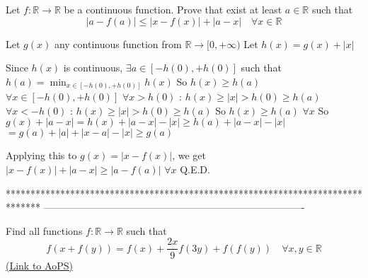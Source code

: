 \begin{solution}
	\begin{tcolorbox}Let $f:\mathbb{R}\to \mathbb{R}$ be a continuous function. Prove that exist at least $a\in \mathbb{R}$ such that 
\[\left| {a - f\left( a \right)} \right| \le \left| {x - f\left( x \right)} \right| + \left| {a - x} \right| \quad \forall x\in \mathbb{R}\]\end{tcolorbox}
Let $g(x)$ any continuous function from $\mathbb R\to[0,+\infty)$
Let $h(x)=g(x)+|x|$

Since $h(x)$ is continuous, $\exists a\in[-h(0),+h(0)]$ such that $h(a)=\min_{x\in[-h(0),+h(0)]}h(x)$
So $h(x)\ge h(a)$ $\forall x\in[-h(0),+h(0)]$
$\forall x>h(0)$ : $h(x)\ge |x|>h(0)\ge h(a)$
$\forall x<-h(0)$ : $h(x)\ge|x|>h(0)\ge h(a)$
So $h(x)\ge h(a)$ $\forall x$
So $g(x)+|a-x|=h(x)+|a-x|-|x|\ge h(a)+|a-x|-|x|$ $=g(a)+|a|+|x-a|-|x|\ge g(a)$

Applying this to $g(x)=|x-f(x)|$, we get $|x-f(x)|+|a-x|\ge |a-f(a)|$ $\forall x$
Q.E.D.
\end{solution}
*******************************************************************************
-------------------------------------------------------------------------------

\begin{problem}
	Find all functions $f: \mathbb{R}\to \mathbb{R}$ such that \[f(x+f(y))=f(x)+\frac{2x}{9}f(3y)+f(f(y))\quad \forall x,y\in\mathbb R \]
	\flushright \href{https://artofproblemsolving.com/community/c6h568382}{(Link to AoPS)}
\end{problem}



